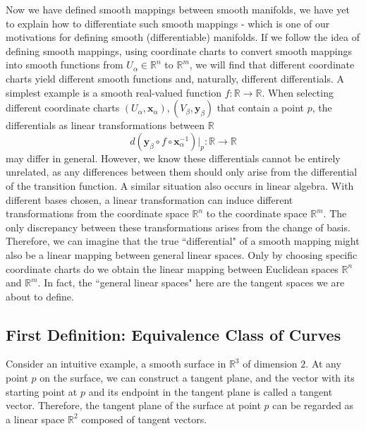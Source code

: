 \documentclass{report}
\begin{document}
Now we have defined smooth mappings between smooth manifolds, we have yet to explain how to differentiate such smooth mappings - which is one of our motivations for defining smooth (differentiable) manifolds. If we follow the idea of defining smooth mappings, using coordinate charts to convert smooth mappings into smooth functions from $U_\alpha\in\mathbb{R}^n$ to $\mathbb{R}^m$, we will find that different coordinate charts yield different smooth functions and, naturally, different differentials. A simplest example is a smooth real-valued function $f:\mathbb{R}\to\mathbb{R}$. When selecting different coordinate charts $(U_\alpha,\mathbf{x}_\alpha),(V_\beta,\mathbf{y}_\beta)$ that contain a point $p$, the differentials as linear transformations between $\mathbb{R}$
$$
d(\mathbf{y}_\beta \circ f\circ \mathbf{x}_\alpha^{-1})|_p:\mathbb{R}\longrightarrow\mathbb{R}
$$
may differ in general. However, we know these differentials cannot be entirely unrelated, as any differences between them should only arise from the differential of the transition function. A similar situation also occurs in linear algebra. With different bases chosen, a linear transformation can induce different transformations from the coordinate space $\mathbb{R}^n$ to the coordinate space $\mathbb{R}^m$. The only discrepancy between these transformations arises from the change of basis. Therefore, we can imagine that the true ``differential" of a smooth mapping might also be a linear mapping between general linear spaces. Only by choosing specific coordinate charts do we obtain the linear mapping between Euclidean spaces $\mathbb{R}^n$ and $\mathbb{R}^m$. In fact, the ``general linear spaces" here are the tangent spaces we are about to define.

\subsection{First Definition: Equivalence Class of Curves}
Consider an intuitive example, a smooth surface in $\mathbb{R}^3$ of dimension $2$. At any point $p$ on the surface, we can construct a tangent plane, and the vector with its starting point at $p$ and its endpoint in the tangent plane is called a tangent vector. Therefore, the tangent plane of the surface at point $p$ can be regarded as a linear space $\mathbb{R}^2$ composed of tangent vectors.
\end{document}
